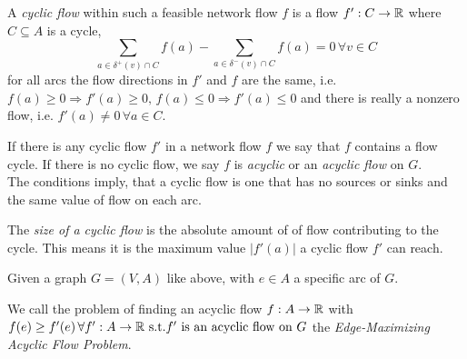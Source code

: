 \begin{definition}
A \textit{cyclic flow} within such a feasible network flow $f$ is a flow $f':C\to \mathbb{R}$ where $C\subseteq A$ is a cycle, 
$$\sum_{a\in \delta^+(v)\cap C}f(a)-\sum_{a\in\delta^-(v)\cap C}f(a) = 0 \, \forall v\in C$$ for all arcs the flow 
directions in $f'$ and $f$ are the same, i.e. $f(a)\ge 0\Rightarrow f'(a)\ge 0,\, f(a)\le 0 \Rightarrow f'(a)\le 0$ and 
there is really a nonzero flow, i.e. $f'(a) \ne 0 \,\forall a\in C$. 

If there is any cyclic flow $f'$ in a network flow $f$ we say that $f$ contains a flow cycle. If there is no cyclic 
flow, we say $f$ is \textit{acyclic} or an \textit{acyclic flow} on $G$.\\

The conditions imply, that a cyclic flow is one that has no sources or sinks and the same value of flow on each arc.

The \textit{size of a cyclic flow} is the absolute amount of of flow contributing to the cycle. This means it is the 
maximum value $|f'(a)|$ a cyclic flow $f'$ can reach. 
\end{definition}


\begin{definition}
  Given a graph $G=(V,A)$ like above, with $e \in A$ a specific arc of $G$. 
  
  We call the problem of finding an acyclic flow $f:A\to \mathbb{R}$ with $f(e)\ge f'(e)\,\forall f':A\to \mathbb{R} \textrm{ s.t.} f' 
\textrm{ is an acyclic flow on }G$ the \textit{ Edge-Maximizing Acyclic Flow Problem}.
\end{definition}

